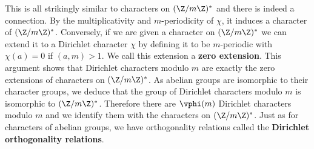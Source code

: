 \documentclass[12pt]{article}
\begin{document}
      This is all strikingly similar to characters on \((\Z/m\Z)^{\ast}\) and there is indeed a connection. By the multiplicativity and \(m\)-periodicity of \(\chi\), it induces a character of \((\Z/m\Z)^{\ast}\). Conversely, if we are given a character on \((\Z/m\Z)^{\ast}\) we can extend it to a Dirichlet character \(\chi\) by defining it to be \(m\)-periodic with \(\chi(a) = 0\) if \((a,m) > 1\). We call this extension a \textbf{zero extension}. This argument shows that Dirichlet characters modulo \(m\) are exactly the zero extensions of characters on \((\Z/m\Z)^{\ast}\). As abelian groups are isomorphic to their character groups, we deduce that the group of Dirichlet characters modulo \(m\) is isomorphic to \((\Z/m\Z)^{\ast}\). Therefore there are \(\vphi(m)\) Dirichlet characters modulo \(m\) and we identify them with the characters on \((\Z/m\Z)^{\ast}\). Just as for characters of abelian groups, we have orthogonality relations called the \textbf{Dirichlet orthogonality relations}.
\end{document}

